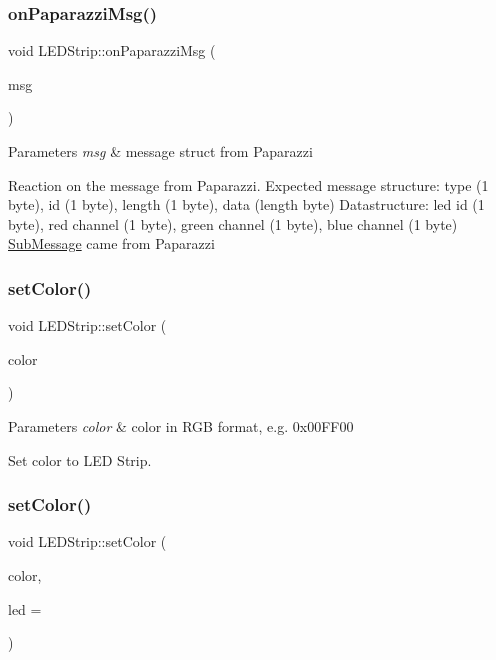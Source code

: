 \subsubsection{\texorpdfstring{on\+Paparazzi\+Msg()}{onPaparazziMsg()}}
{\footnotesize\ttfamily void L\+E\+D\+Strip\+::on\+Paparazzi\+Msg (\begin{DoxyParamCaption}\item[{\hyperlink{struct_sub_message}{Sub\+Message} $\ast$}]{msg }\end{DoxyParamCaption})\hspace{0.3cm}{\ttfamily [virtual]}}


\begin{DoxyParams}{Parameters}
{\em msg} & message struct from Paparazzi\\
\hline
\end{DoxyParams}
Reaction on the message from Paparazzi. Expected message structure\+: type (1 byte), id (1 byte), length (1 byte), data (length byte) Datastructure\+: led id (1 byte), red channel (1 byte), green channel (1 byte), blue channel (1 byte) \hyperlink{struct_sub_message}{Sub\+Message} came from Paparazzi \mbox{\label{class_l_e_d_strip_a310b381acdd83a01ddb6e2debebbbc7c}} 
\subsubsection{\texorpdfstring{set\+Color()}{setColor()}\hspace{0.1cm}{\footnotesize\ttfamily [1/2]}}
{\footnotesize\ttfamily void L\+E\+D\+Strip\+::set\+Color (\begin{DoxyParamCaption}\item[{unsigned int}]{color }\end{DoxyParamCaption})}


\begin{DoxyParams}{Parameters}
{\em color} & color in R\+GB format, e.\+g. 0x00\+F\+F00\\
\hline
\end{DoxyParams}
Set color to L\+ED Strip. \mbox{\label{class_l_e_d_strip_a1f9d9c2784c9ad893163f7f17e603ce7}} 
\subsubsection{\texorpdfstring{set\+Color()}{setColor()}\hspace{0.1cm}{\footnotesize\ttfamily [2/2]}}
{\footnotesize\ttfamily void L\+E\+D\+Strip\+::set\+Color (\begin{DoxyParamCaption}\item[{unsigned int}]{color,  }\item[{uint8\+\_\+t}]{led = {} }\end{DoxyParamCaption})}


